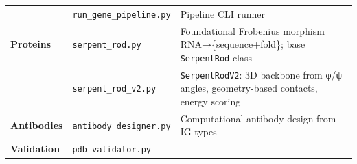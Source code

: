 \begin{longtable}[]{@{}lll@{}}
\begin{minipage}[t]{0.23\columnwidth}\raggedright
\strut
\end{minipage} & \begin{minipage}[t]{0.26\columnwidth}\raggedright
\texttt{run\_gene\_pipeline.py}\strut
\end{minipage} & \begin{minipage}[t]{0.42\columnwidth}\raggedright
Pipeline CLI runner\strut
\end{minipage}\tabularnewline
\begin{minipage}[t]{0.23\columnwidth}\raggedright
\textbf{Proteins}\strut
\end{minipage} & \begin{minipage}[t]{0.26\columnwidth}\raggedright
\texttt{serpent\_rod.py}\strut
\end{minipage} & \begin{minipage}[t]{0.42\columnwidth}\raggedright
Foundational Frobenius morphism RNA→\{sequence+fold\}; base
\texttt{SerpentRod} class\strut
\end{minipage}\tabularnewline
\begin{minipage}[t]{0.23\columnwidth}\raggedright
\strut
\end{minipage} & \begin{minipage}[t]{0.26\columnwidth}\raggedright
\texttt{serpent\_rod\_v2.py}\strut
\end{minipage} & \begin{minipage}[t]{0.42\columnwidth}\raggedright
\texttt{SerpentRodV2}: 3D backbone from φ/ψ angles, geometry-based
contacts, energy scoring\strut
\end{minipage}\tabularnewline
\begin{minipage}[t]{0.23\columnwidth}\raggedright
\textbf{Antibodies}\strut
\end{minipage} & \begin{minipage}[t]{0.26\columnwidth}\raggedright
\texttt{antibody\_designer.py}\strut
\end{minipage} & \begin{minipage}[t]{0.42\columnwidth}\raggedright
Computational antibody design from IG types\strut
\end{minipage}\tabularnewline
\begin{minipage}[t]{0.23\columnwidth}\raggedright
\textbf{Validation}\strut
\end{minipage} & \begin{minipage}[t]{0.26\columnwidth}\raggedright
\texttt{pdb\_validator.py}\strut
\end{minipage} & \begin{minipage}[t]{0.42\columnwidth}\raggedright

\end{minipage}
\end{longtable}
